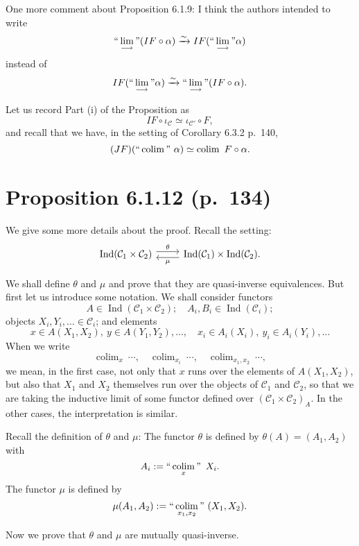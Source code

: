 \documentclass[12pt]{article}
\theoremstyle{remark}
\theoremstyle{definition}
\newcommand{\C}{\mathcal C}
\newcommand{\colim}{\operatornamewithlimits{\underset{\longrightarrow}{lim}}}
\DeclareMathOperator*{\coli}{colim}
\DeclareMathOperator*{\co}{colim}
\DeclareMathOperator*{\ic}{``\coli"}
\DeclareMathOperator{\Ind}{Ind}
\begin{document}
One more comment about Proposition 6.1.9: I think the authors intended to write 
%
\begin{equation}\label{133ii}
``\colim"(IF\circ\alpha)\xrightarrow\sim IF(``\colim"\alpha)
\end{equation} 
%
instead of 
$$
IF(``\colim"\alpha)\xrightarrow\sim``\colim"(IF\circ\alpha). 
$$ 

Let us record Part (i) of the Proposition as 
%
\begin{equation}\label{133i}
IF\circ\iota_\C\simeq\iota_{\C'}\circ F, 
\end{equation} 
%
and recall that we have, in the setting of Corollary 6.3.2 p.~140, 
%
\begin{equation}\label{140}
(JF)(``\coli"\ \alpha)\simeq\coli\ F\circ\alpha.
\end{equation} 
%
%
\section{Proposition 6.1.12 (p.~134)} %
%
We give some more details about the proof. Recall the setting: 
$$
\begin{tikzcd}
\Ind(\C_1\times\C_2)\ar[yshift=0.7ex]{r}{\theta}&\Ind(\C_1)\times\Ind(\C_2).\ar[yshift=-0.7ex]{l}{\mu}
\end{tikzcd}
$$ 

We shall define $\theta$ and $\mu$ and prove that they are quasi-inverse equivalences. But first let us introduce some notation. We shall consider functors 
$$
A\in\Ind(\C_1\times\C_2);\quad A_i,B_i\in\Ind(\C_i);
$$ 
objects $X_i,Y_i,\dots\in\C_i$; and elements 
$$
x\in A(X_1,X_2),\ y\in A(Y_1,Y_2),\dots,\quad x_i\in A_i(X_i),\ y_i\in A_i(Y_i),\dots
$$ 
When we write 
$$
\co_x\ \cdots,\quad \co_{x_i}\ \cdots,\quad \co_{x_1,x_2}\ \cdots,
$$ 
we mean, in the first case, not only that $x$ runs over the elements of $A(X_1,X_2)$, but also that $X_1$ and $X_2$ themselves run over the objects of $\C_1$ and $\C_2$, so that we are taking the inductive limit of some functor defined over $(\C_1\times\C_2)_A$. In the other cases, the interpretation is similar. 

Recall the definition of $\theta$ and $\mu$: The functor $\theta$ is defined by $\theta(A)=(A_1,A_2)$ with
%
\begin{equation}\label{ai}
A_i:=\ic_x\ X_i. 
\end{equation}
%
The functor $\mu$ is defined by 
$$
\mu(A_1,A_2):=\ic_{x_1,x_2}\ (X_1,X_2). 
$$ 

Now we prove that $\theta$ and $\mu$ are mutually quasi-inverse. 
\end{document}
